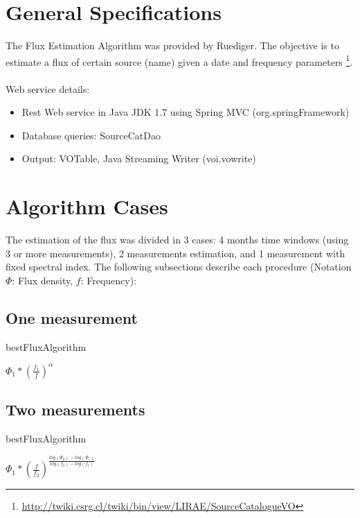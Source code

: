 \documentclass[10pt]{article}
\title{
\center{\emph{Flux Estimation Algorithm} \\}
\author{
        Ruediger Kneissl, Jonathan Antognini\\
}}
\begin{document}
\maketitle

\tableofcontents

\section{General Specifications}

The Flux Estimation Algorithm was provided by Ruediger. The objective is to estimate
a flux of certain source (name) given a date and frequency parameters
\footnote{\url{http://twiki.csrg.cl/twiki/bin/view/LIRAE/SourceCatalogueVO}}.\\\\
\noindent Web service details:
\begin{itemize}
 \item Rest Web service in Java JDK 1.7 using Spring MVC (org.springFramework)
 \item Database queries: SourceCatDao
 \item Output: VOTable, Java Streaming Writer (voi.vowrite)
\end{itemize}

\section{Algorithm Cases}

The estimation of the flux was divided in 3 cases: 4 months time windows (using
3 or more measurements), 2 measurements estimation, and 1 measurement with
fixed spectral index.  The following subsections describe each procedure (Notation $\Phi$: Flux density, $f$: Frequency):

\subsection{One measurement}
\begin{algorithm}
\caption{bestFluxAlgorithm}\label{1ms}
\begin{algorithmic}[1]
\State \Return $\Phi_1 * \left(\frac{f_{1}}{f}\right)^{\alpha}$
\EndProcedure
\end{algorithmic}
\end{algorithm}

\subsection{Two measurements}
\begin{algorithm}
\caption{bestFluxAlgorithm}\label{2ms}
\begin{algorithmic}[1]
\State \Return $\Phi_{1} * \left(\frac{f}{f_{2}}\right)^{\frac{log(\Phi_{2}) - log(\Phi_{1})} {log(f_{2}) - log(f_{1})}}$
\EndProcedure
\end{algorithmic}
\end{algorithm}
\end{document}
